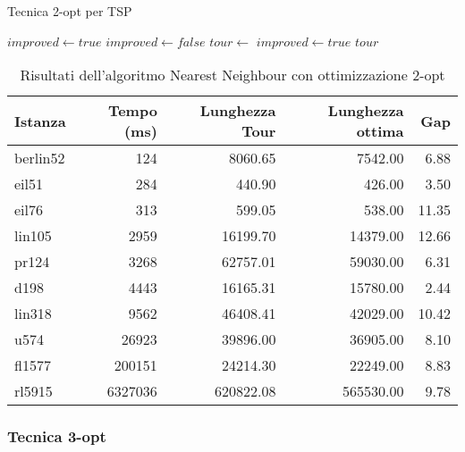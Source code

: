 \begin{algorithm}
	\caption{Tecnica 2-opt per \Gls{TSP}}\label{alg:twoopt}
	\begin{algorithmic}[1]
		\State $improved \gets true$
		\State $improved \gets false$
		\State $tour \gets$ 
		\State $improved \gets true$
		\EndIf
		\EndFor
		\EndFor
		\EndWhile
		\State \Return $tour$
		\EndProcedure
	\end{algorithmic}
\end{algorithm}


\begin{table}
	\centering
	\caption{Risultati dell'algoritmo Nearest Neighbour con ottimizzazione 2-opt}
	\begin{tabular}{lrrrr}
		\toprule
		Istanza  & Tempo (ms) & Lunghezza Tour & Lunghezza ottima & Gap   \\
		\midrule
		berlin52 & 124        & 8060.65        & 7542.00          & 6.88  \\
		eil51    & 284        & 440.90         & 426.00           & 3.50  \\
		eil76    & 313        & 599.05         & 538.00           & 11.35 \\
		lin105   & 2959       & 16199.70       & 14379.00         & 12.66 \\
		pr124    & 3268       & 62757.01       & 59030.00         & 6.31  \\
		d198     & 4443       & 16165.31       & 15780.00         & 2.44  \\
		lin318   & 9562       & 46408.41       & 42029.00         & 10.42 \\
		u574     & 26923      & 39896.00       & 36905.00         & 8.10  \\
		fl1577   & 200151     & 24214.30       & 22249.00         & 8.83  \\
		rl5915   & 6327036    & 620822.08      & 565530.00        & 9.78  \\
		\bottomrule
	\end{tabular}
\end{table}


\subsubsection{Tecnica 3-opt}


